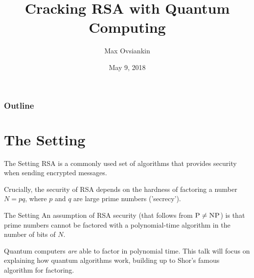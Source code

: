 \documentclass{beamer}
\title{Cracking RSA with Quantum Computing}
\author{Max Ovsiankin}
\date{May 9, 2018}
\begin{document}
\begin{frame}
    \titlepage
\end{frame}

\begin{frame}
    \frametitle{Outline}
    \tableofcontents
\end{frame}
\section{The Setting}

\begin{frame}{The Setting}
    RSA is a commonly used set of algorithms that provides security when sending encrypted messages. \pause 
    
    Crucially, the security of RSA depends on the hardness of factoring a number $N = pq$, where $p$ and $q$ are large prime numbers ('secrecy'). \pause

\end{frame}

\begin{frame}{The Setting}
    An assumption of RSA security (that follows from $\textsc{P} \neq \textsc{NP}$) is that prime numbers cannot be factored with a polynomial-time algorithm in the number of bits of $N$. \pause
    
    Quantum computers \textit{are} able to factor in polynomial time. This talk will focus on explaining how quantum algorithms work, building up to Shor's famous algorithm for factoring.
\end{frame}
\end{document}
